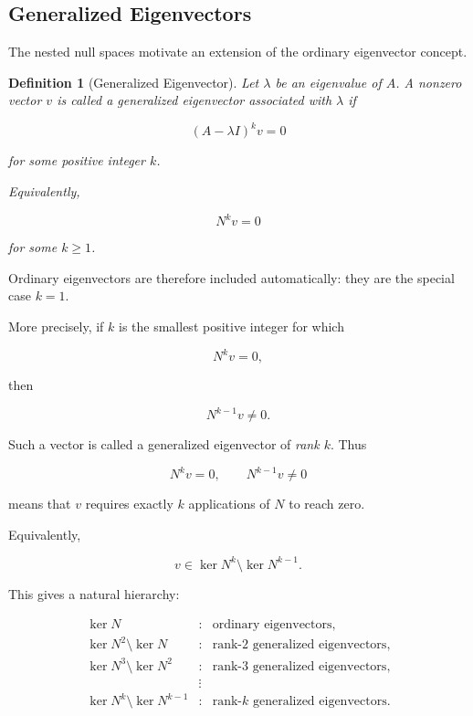 \documentclass[11pt]{article}
\newtheorem{definition}[theorem]{Definition}
\begin{document}
\subsection{Generalized Eigenvectors}

The nested null spaces motivate an extension of the ordinary
eigenvector concept.

\begin{definition}[Generalized Eigenvector]
Let \(\lambda\) be an eigenvalue of \(A\).  A nonzero vector \(v\) is
called a \emph{generalized eigenvector} associated with \(\lambda\) if

\[
\boxed{
(A-\lambda I)^k v=0
}
\]

for some positive integer \(k\).

Equivalently,

\[
N^k v=0
\]

for some \(k\geq1\).
\end{definition}

Ordinary eigenvectors are therefore included automatically: they are
the special case \(k=1\).

More precisely, if \(k\) is the smallest positive integer for which

\[
N^k v=0,
\]

then

\[
N^{k-1}v\neq0.
\]

Such a vector is called a generalized eigenvector of \emph{rank \(k\)}.
Thus

\[
\boxed{
N^k v=0,
\qquad
N^{k-1}v\neq0
}
\]

means that \(v\) requires exactly \(k\) applications of \(N\) to reach
zero.

Equivalently,

\[
\boxed{
v\in\ker N^k\setminus\ker N^{k-1}.
}
\]

This gives a natural hierarchy:

\[
\begin{array}{ccl}
\ker N
&:&
\text{ordinary eigenvectors},\\[1mm]
\ker N^2\setminus\ker N
&:&
\text{rank-2 generalized eigenvectors},\\[1mm]
\ker N^3\setminus\ker N^2
&:&
\text{rank-3 generalized eigenvectors},\\
&\vdots&\\
\ker N^k\setminus\ker N^{k-1}
&:&
\text{rank-\(k\) generalized eigenvectors}.
\end{array}
\]
\end{document}
